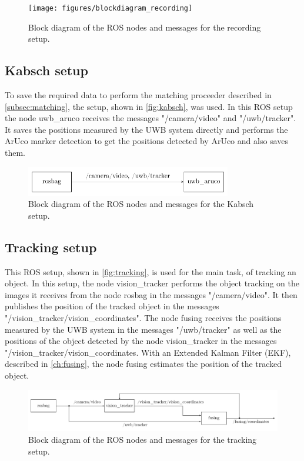 \begin{figure}[h]\centering
	\texttt{[image: figures/blockdiagram\_recording]}
	\caption{Block diagram of the ROS nodes and messages for the recording setup.}\label{fig:recording}
\end{figure}

\subsection{Kabsch setup}\label{subsec:kabsch}
To save the required data to perform the matching proceeder described in \autoref{subsec:matching}, the setup, shown in \autoref{fig:kabsch}, was used. In this ROS setup the node uwb\_aruco receives the messages "/camera/video" and "/uwb/tracker". It saves the positions measured by the UWB system directly and performs the ArUco marker detection to get the positions detected by ArUco and also saves them.

\begin{figure}[h]\centering
	\includegraphics[width=0.8\textwidth]{figures/blockdiagram_kabsch}
	\caption{Block diagram of the ROS nodes and messages for the Kabsch setup.}\label{fig:kabsch}
\end{figure}

\subsection{Tracking setup}\label{subsec:tracking}
This ROS setup, shown in \autoref{fig:tracking}, is used for the main task, of tracking an object. In this setup, the node vision\_tracker performs the object tracking on the images it receives from the node rosbag in the messages "/camera/video". It then publishes the position of the tracked object in the messages "/vision\_tracker/vision\_coordinates". The node fusing receives the positions measured by the UWB system in the messages "/uwb/tracker" as well as the positions of the object detected by the node vision\_tracker in the messages "/vision\_tracker/vision\_coordinates. With an Extended Kalman Filter (EKF), described in \autoref{ch:fusing}, the node fusing estimates the position of the tracked object.

\begin{figure}[h]\centering
	\includegraphics[width=1.0\textwidth]{figures/blockdiagram_tracking}
	\caption{Block diagram of the ROS nodes and messages for the tracking setup.}\label{fig:tracking}
\end{figure}
